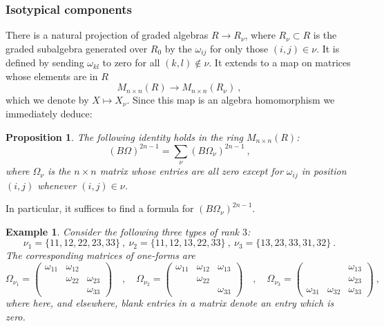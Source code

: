 \documentclass[10pt]{amsart}
\theoremstyle{plain}
\newtheorem{prop}[thm]{Proposition}
\newtheorem{ex}[thm]{Example}
\newcommand{\To}{\longrightarrow}
\newcommand{\0}{\color{blue}{\mathsf{0}}}
\begin{document}
\subsubsection{Isotypical components} 
There is a natural projection of graded algebras 
$ R \rightarrow  R_{\nu}$, 
where $R_{\nu} \subset R$ is the graded subalgebra generated over $R_0$  by the $\omega_{ij}$ for only those $(i,j) \in \nu$.
It is defined by sending $\omega_{kl}$ to zero for all $(k,l) \notin \nu. $ It extends to a map on matrices whose elements are in $R$
\[ M_{n\times n}(R) \To M_{n\times n}(R_{\nu})\ , \]
which we  denote by $X\mapsto X_{\nu}$. Since this map is an algebra homomorphism we immediately deduce:

\begin{prop}  \label{propBOmegaasSumoftypes} The following identity holds in the ring $M_{n\times n}(R)$:
   \begin{equation} \label{BOmegaAsSumIsotypical} (B \Omega)^{2n-1}  =  \sum_{\nu}  (B \Omega_{\nu})^{2n-1} \ ,
   \end{equation}
   where $\Omega_{\nu}$ is the $n\times n$ matrix whose entries are all zero except for $\omega_{ij}$ in position $(i,j)$
whenever $(i,j) \in \nu$.
\end{prop}
In particular, it suffices to find a formula for $ (B \Omega_{\nu})^{2n-1}$.

\begin{ex} \label{example of types}
    Consider the following three types of rank $3$:
\[ \nu_1 = \{11,12,22,23,33\} \ , \   \nu_2 = \{11,12,13,22,33\} \ ,  \  \nu_3 = \{13,23,33,31,32\}\ . \]  
The corresponding matrices of one-forms are 
\[\Omega_{\nu_1} = \begin{pmatrix} \omega_{11} & \omega_{12} & \\ & \omega_{22} & \omega_{23} \\ & & \omega_{33} 
\end{pmatrix} \quad , \quad   
\Omega_{\nu_2} = \begin{pmatrix} \omega_{11} & \omega_{12} &  \omega_{13}\\ & \omega_{22} &  \\ & & \omega_{33} 
\end{pmatrix} \quad  , \quad   \Omega_{\nu_3} = \begin{pmatrix} & &  \omega_{13} \\ 
&&\omega_{23}\\
\omega_{31} &\omega_{32}& \omega_{33}
\end{pmatrix}\ ,
\] 
where here, and elsewhere, blank entries in a matrix denote an entry which is zero.  
\end{ex}
\end{document}
